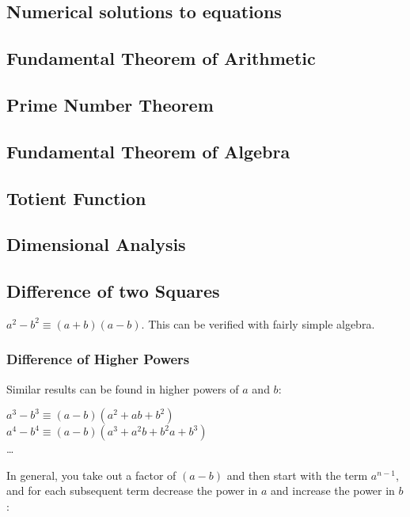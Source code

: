 \documentclass[a4paper,11pt]{article}
\begin{document}
    \subsection{Numerical solutions to equations}

    \subsection{Fundamental Theorem of Arithmetic}

    \subsection{Prime Number Theorem}

    \subsection{Fundamental Theorem of Algebra}

    \subsection{Totient Function} \label{sec:totient}

    \subsection{Dimensional Analysis}

    \subsection{Difference of two Squares}

    $a^2 - b^2 \equiv (a + b)(a - b)$. This can be verified with fairly simple
    algebra.

    \subsubsection{Difference of Higher Powers}

    Similar results can be found in higher powers of $a$ and $b$:

    $a^3 - b^3 \equiv (a - b)(a^2 + ab + b^2)$
    \\$a^4 - b^4 \equiv (a - b)(a^3 + a^2b + b^2a + b^3)$
    \\\ldots

    In general, you take out a factor of $(a - b)$ and then start with the term
    $a^{n - 1}$, and for each subsequent term decrease the power in $a$ and
    increase the power in $b$:
\end{document}
